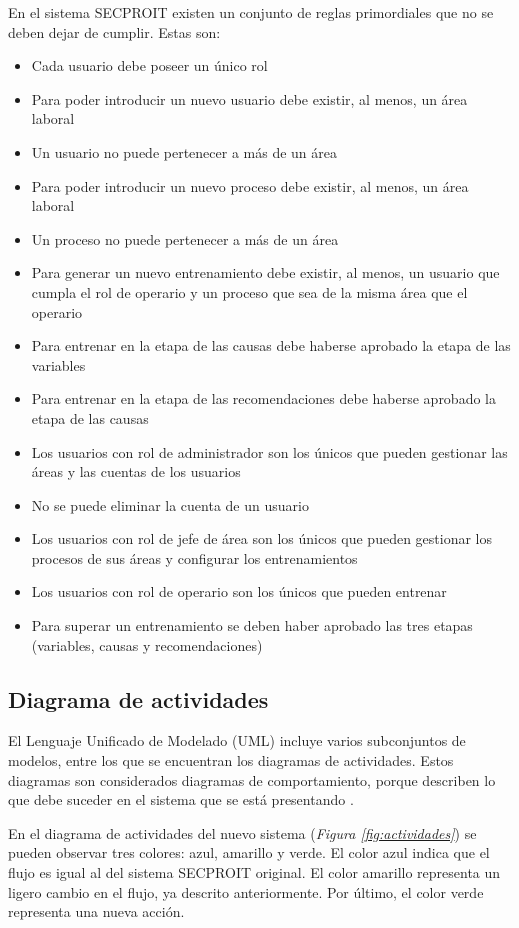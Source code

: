 En el sistema SECPROIT existen un conjunto de reglas primordiales que no se deben dejar de cumplir. Estas son:
\begin{itemize}
\item Cada usuario debe poseer un único rol
\item Para poder introducir un nuevo usuario debe existir, al menos, un área laboral
\item Un usuario no puede pertenecer a más de un área
\item Para poder introducir un nuevo proceso debe existir, al menos, un área laboral
\item Un proceso no puede pertenecer a más de un área
\item Para generar un nuevo entrenamiento debe existir, al menos, un usuario que cumpla el rol de operario y un proceso que sea de la misma área que el operario
\item Para entrenar en la etapa de las causas debe haberse aprobado la etapa de las variables
\item Para entrenar en la etapa de las recomendaciones debe haberse aprobado la etapa de las causas
\item Los usuarios con rol de administrador son los únicos que pueden gestionar las áreas y las cuentas de los usuarios
\item No se puede eliminar la cuenta de un usuario
\item Los usuarios con rol de jefe de área son los únicos que pueden gestionar los procesos de sus áreas y configurar los entrenamientos
\item Los usuarios con rol de operario son los únicos que pueden entrenar
\item Para superar un entrenamiento se deben haber aprobado las tres etapas (variables, causas y recomendaciones)
\end{itemize}

\subsection{Diagrama de actividades}
El Lenguaje Unificado de Modelado (UML) incluye varios subconjuntos de modelos, entre los que se encuentran los diagramas de actividades. Estos diagramas son considerados diagramas de comportamiento, porque describen lo que debe suceder en el sistema que se está presentando \cite{Eriksson2000}.

En el diagrama de actividades del nuevo sistema (\textsl{Figura \ref{fig:actividades}}) se pueden observar tres colores: azul, amarillo y verde. El color azul indica que el flujo es igual al del sistema SECPROIT original. El color amarillo representa un ligero cambio en el flujo, ya descrito anteriormente. Por último, el color verde representa una nueva acción.


